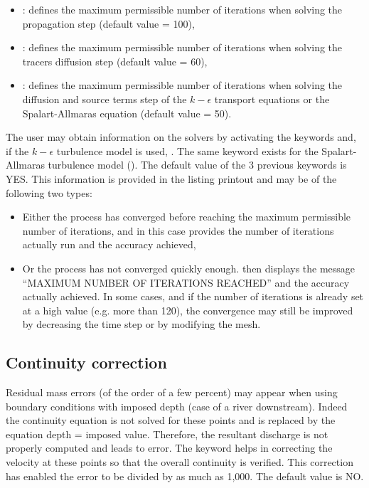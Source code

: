 \begin{itemize}
\item {}:
defines the maximum permissible number of iterations
when solving the propagation step (default value = 100),

\item {}:
defines the maximum permissible number of iterations
when solving the tracers diffusion step (default value = 60),

\item {}:
defines the maximum permissible number of iterations when solving the diffusion
and source terms step of the $k-\epsilon$ transport equations
or the Spalart-Allmaras equation (default value = 50).
\end{itemize}

The user may obtain information on the solvers by activating the keywords
 and, if the $k-\epsilon$ turbulence model
is used, .
The same keyword exists for the Spalart-Allmaras turbulence model
().
The default value of the 3 previous keywords is YES.
This information is provided in the listing printout
and may be of the following two types:
\begin{itemize}
\item Either the process has converged before reaching the maximum permissible
number of iterations, and in this case  provides the number of
iterations actually run and the accuracy achieved,
\item Or the process has not converged quickly enough.
 then displays the message ``MAXIMUM NUMBER OF ITERATIONS REACHED''
and the accuracy actually achieved.
In some cases, and if the number of iterations is already set
at a high value (e.g. more than 120), the convergence may still be improved
by decreasing the time step or by modifying the mesh.
\end{itemize}

\subsection{Continuity correction}

Residual mass errors (of the order of a few percent) may appear when using
boundary conditions with imposed depth (case of a river downstream).
Indeed the continuity equation is not solved for these points and is replaced
by the equation depth = imposed value.
Therefore, the resultant discharge is not properly computed and leads to error.
The keyword  helps in correcting the velocity
at these points so that the overall continuity is verified.
This correction has enabled the error to be divided by as much as 1,000.
The default value is NO.

